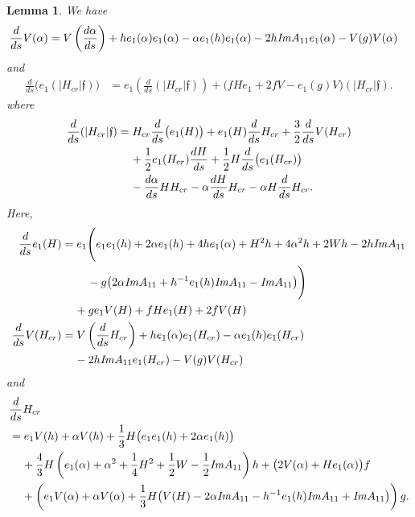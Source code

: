 \documentclass{amsart}
\newtheorem{lem}[theorem]{Lemma}
\theoremstyle{Corollary}
\numberwithin{equation}{section}
\begin{document}
\begin{lem}\label{lem7.5} We have 
\begin{align*}
\frac{d}{ds}V(\alpha)
&=V\left(\frac{d\alpha}{ds}\right)+h e_1(\alpha)e_1(\alpha)-\alpha e_1(h)e_1(\alpha)-2h\mbox{\emph{Im}}A_{11}e_1(\alpha)
-V(g)V(\alpha)
\end{align*}
and 
\begin{align*}
\frac{d}{ds}\big(e_1(|H_{cr}|\mathfrak{f})\big)
&=e_1\left(\frac{d}{ds}(|H_{cr}|\mathfrak{f})\right)+
\big(fHe_1 +2fV-e_1(g)V\big)(|H_{cr}|\mathfrak{f}).
\end{align*}
where 
\begin{align*}
\frac{d}{ds}(|H_{cr}|\mathfrak{f})
&= H_{cr}\frac{d}{ds}\big(e_1(H)\big)
+e_1(H)\frac{d}{ds}H_{cr}+\frac{3}{2}\frac{d}{ds}V(H_{cr})\\
&\hspace{4mm}+\frac{1}{2}e_1(H_{cr})\frac{dH}{ds}+\frac{1}{2}H\frac{d}{ds}\big(e_1(H_{cr})\big)\\
&\hspace{4mm}-\frac{d\alpha}{ds} H H_{cr}-\alpha\frac{dH}{ds}H_{cr}
-\alpha H\frac{d}{ds}H_{cr}.
\end{align*}
Here, 
\begin{align*}
\frac{d}{ds}e_1(H)
&=e_1\Bigg(e_1e_1(h)+2\alpha e_1(h)+4he_1(\alpha)+H^2h+4\alpha^2h+2Wh-2h\mbox{\emph{Im}}A_{11}\\
&\hspace{8mm}
-g\big(
2\alpha\mbox{\emph{Im}}A_{11}+h^{-1}e_1(h)\mbox{\emph{Im}}A_{11}-\mbox{\emph{Im}}A_{11}\big)\Bigg)\\
&\hspace{4mm}
+ge_1V(H)+fHe_1(H) +2fV(H)\\
\frac{d}{ds}V(H_{cr})
&=V\left(\frac{d}{ds}H_{cr}\right)+
h e_1(\alpha)e_1(H_{cr})-\alpha e_1(h)e_1(H_{cr})\\
&\hspace{4mm}-2h\mbox{\emph{Im}}A_{11}e_1(H_{cr})
-V(g)V(H_{cr})
\end{align*}
and 
\begin{align*}
&\frac{d}{ds}H_{cr}\\
&=e_1V(h)+\alpha V(h)+\frac{1}{3}H\big(e_1e_1(h)+2\alpha e_1(h)\big)\\
&\hspace{4mm}+\frac{4}{3}H\left(e_1(\alpha)+\alpha^2+\frac{1}{4}H^2+\frac{1}{2}W-\frac{1}{2}\mbox{\emph{Im}}A_{11}\right)h
+\big(2V(\alpha)+He_1(\alpha)\big)f\\
&\hspace{4mm}+\left(e_1V(\alpha)+\alpha V(\alpha)
+\frac{1}{3}H\big(V(H)-2\alpha\mbox{\emph{Im}}A_{11}-h^{-1}e_1(h)\mbox{\emph{Im}}A_{11}+\mbox{\emph{Im}}A_{11}\big)\right)g.
\end{align*}
\end{lem}
\end{document}
